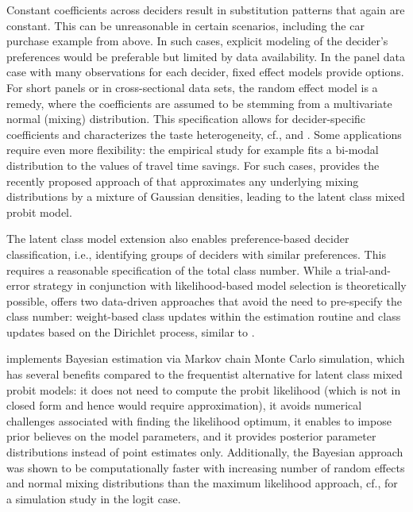 \documentclass[article,shortnames]{jss}
\begin{document}
Constant coefficients across deciders result in substitution patterns that again are constant. This can be unreasonable in certain scenarios, including the car purchase example from above. In such cases, explicit modeling of the decider's preferences would be preferable but limited by data availability. In the panel data case with many observations for each decider, fixed effect models provide options. For short panels or in cross-sectional data sets, the random effect model is a remedy, where the coefficients are assumed to be stemming from a multivariate normal (mixing) distribution. This specification allows for decider-specific coefficients and characterizes the taste heterogeneity, cf., \cite{Train:2009} and \cite{Bhat:2011}. Some applications require even more flexibility: the empirical study \cite{Cirillo:2006} for example fits a bi-modal distribution to the values of travel time savings. For such cases,  provides the recently proposed approach of \cite{Oelschlaeger:2020} that approximates any underlying mixing distributions by a mixture of Gaussian densities, leading to the latent class mixed probit model.

The latent class model extension also enables preference-based decider classification, i.e., identifying groups of deciders with similar preferences. This requires a reasonable specification of the total class number. While a trial-and-error strategy in conjunction with likelihood-based model selection is theoretically possible,  offers two data-driven approaches that avoid the need to pre-specify the class number: weight-based class updates within the estimation routine \citep{Oelschlaeger:2020} and class updates based on the Dirichlet process, similar to \cite{Burda:2008}.

 implements Bayesian estimation via Markov chain Monte Carlo simulation, which has several benefits compared to the frequentist alternative for latent class mixed probit models: it does not need to compute the probit likelihood (which is not in closed form and hence would require approximation), it avoids numerical challenges associated with finding the likelihood optimum, it enables to impose prior believes on the model parameters, and it provides posterior parameter distributions instead of point estimates only. Additionally, the Bayesian approach was shown to be computationally faster with increasing number of random effects and normal mixing distributions than the maximum likelihood approach, cf., \cite{Train:2001} for a simulation study in the logit case.
\end{document}
